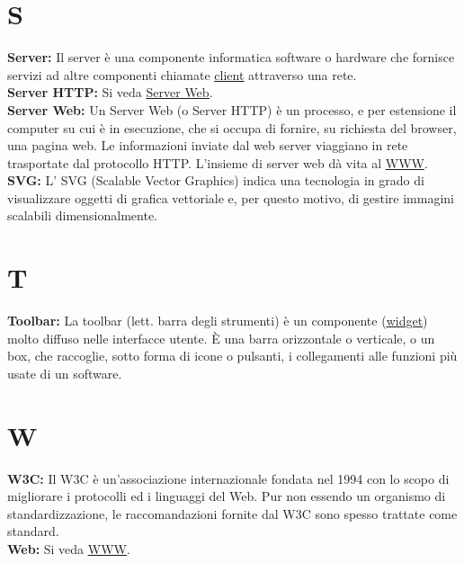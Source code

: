 \section*{S}
\hypertarget{server}{}
\textbf{Server:}
Il server \`e una componente informatica software o hardware che fornisce servizi ad altre componenti chiamate \hyperlink{client}{\underline{client}} attraverso una rete. \\

\hypertarget{serverhttp}{}
\textbf{Server HTTP:}
Si veda \hyperlink{serverweb}{\underline{Server Web}}.\\

\hypertarget{serverweb}{}
\textbf{Server Web:}
Un Server Web (o Server HTTP) \` e un processo, e per estensione il computer su cui \` e in esecuzione, che si occupa di fornire, su richiesta del browser, una pagina web. Le informazioni inviate dal web server viaggiano in rete trasportate dal protocollo HTTP. L'insieme di server web d\` a vita al \hyperlink{www}{\underline{WWW}}.\\ 


\hypertarget{svg}{}
\textbf{SVG:}
L' SVG (Scalable Vector Graphics) indica una tecnologia in grado di visualizzare oggetti di grafica vettoriale e, per questo motivo, di gestire immagini scalabili dimensionalmente.\\

\section*{T}
\hypertarget{toolbar}{}
\textbf{Toolbar:}
La toolbar (lett. barra degli strumenti) \` e un componente (\hyperlink{widget}{\underline{widget}}) molto diffuso nelle interfacce utente. \` E una barra orizzontale o verticale, o un box, che raccoglie, sotto forma di icone o pulsanti, i collegamenti alle funzioni pi\` u usate di un software.\\


\section*{W}
\hypertarget{w3c}{}
\textbf{W3C:}
Il W3C \`e un'associazione internazionale fondata nel 1994 con lo scopo di migliorare i protocolli ed i linguaggi del Web. Pur non essendo un organismo di standardizzazione, le raccomandazioni fornite dal W3C sono spesso trattate come standard.\\

\hypertarget{web}{}
\textbf{Web:}
Si veda \hyperlink{www}{\underline{WWW}}.\\

